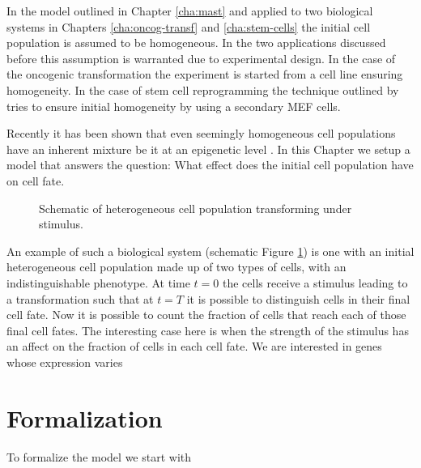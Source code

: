 In the model outlined in Chapter \ref{cha:mast} and applied to two biological systems in Chapters \ref{cha:oncog-transf} and \ref{cha:stem-cells} the initial cell population is assumed to be homogeneous. In the two applications discussed before this assumption is warranted due to experimental design. In the case of the oncogenic transformation the experiment is started from a cell line ensuring homogeneity. In the case of stem cell reprogramming the technique outlined by \cite{Hanna:2009ix} tries to ensure initial homogeneity  by using a secondary MEF cells.

Recently it has been shown that even seemingly homogeneous cell populations have an
inherent mixture be it at an epigenetic level \citep{Heng:2009em,Swanton:2012bm}. In this Chapter we setup a model that
answers the question: What effect does the initial cell population have on cell fate.



\begin{figure}[h]
  \centering
  
  \caption{Schematic of heterogeneous cell population transforming under stimulus.}
  \label{fig:cell-cycle-model}
\end{figure}

An example of such a biological system (schematic Figure \ref{fig:cell-cycle-model}) is
one with an initial heterogeneous cell population made up of two types of cells, with an
indistinguishable phenotype. At time $t=0$ the cells receive a stimulus leading to a
transformation such that at $t=T$ it is possible to distinguish cells in their final cell
fate. Now it is possible to count the fraction of cells that reach each of those final
cell fates. The interesting case here is when the strength of the stimulus has an affect on the
fraction of cells in each cell fate. We are interested in genes whose expression varies


\section{Formalization}
\label{sec:formalization}

To formalize the model we start with 

